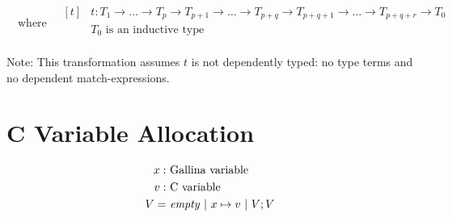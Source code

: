 \documentclass[a4paper,fleqn]{article}
\def\gallina{\textrm{Gallina}}
\newcommand{\kwmatch}{\mbox{\color{mygreen}\ttfamily match}}
\begin{document}
\[ \quad\text{where} \quad
  \begin{aligned}[t]
    & t : T_1 \rightarrow \dots \rightarrow T_p \rightarrow
          T_{p+1} \rightarrow \dots \rightarrow T_{p+q} \rightarrow
          T_{p+q+1} \rightarrow \dots \rightarrow T_{p+q+r} \rightarrow T_0 \\
    & \text{$T_0$ is an inductive type} \\
  \end{aligned}
\]
\raggedright
{\small Note: \quad This transformation assumes $t$ is not dependently typed: no type terms and no dependent \kwmatch-expressions.}

\section{C Variable Allocation}\label{sec:cvaralloc}

\begin{align*}
  x :&\ \mbox{\gallina{} variable} \\
  v :&\ \mbox{C variable} \\
  V =&\ \mathit{empty} ~|~ x \mapsto v ~|~ V;V
\end{align*}
\end{document}
